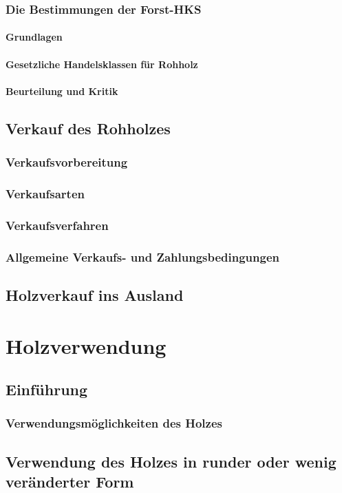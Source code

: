 \documentclass{article}
\begin{document}
\subsubsection{Die Bestimmungen der Forst-HKS}
\paragraph{Grundlagen}
\paragraph{Gesetzliche Handelsklassen für Rohholz}
\paragraph{Beurteilung und Kritik}
\subsection{Verkauf des Rohholzes}
\subsubsection{Verkaufsvorbereitung}
\subsubsection{Verkaufsarten}
\subsubsection{Verkaufsverfahren}
\subsubsection{Allgemeine Verkaufs- und Zahlungsbedingungen}
\subsection{Holzverkauf ins Ausland}
\section{Holzverwendung}
\subsection{Einführung}
\subsubsection{Verwendungsmöglichkeiten des Holzes}
\subsection{Verwendung des Holzes in runder oder wenig veränderter Form}
\end{document}

